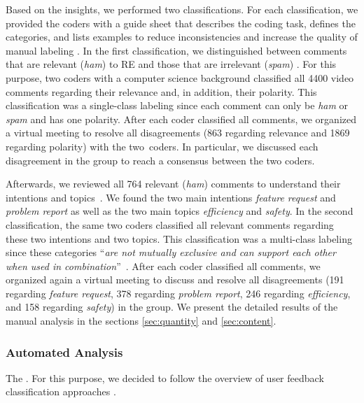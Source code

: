\documentclass[conference]{IEEEtran}
\begin{document}
{Based on the insights, we performed two classifications. For each classification, we provided the coders with a guide sheet that describes the coding task, defines the categories, and lists examples to reduce inconsistencies and increase the quality of manual labeling \cite{Maalej.2015}. In the first classification, we distinguished between comments that are relevant (\textit{ham}) to RE and those that are irrelevant (\textit{spam}) \cite{Santos.2019}. For this purpose, two coders with a computer science background classified all 4400 video comments regarding their relevance and, in addition, their polarity. This classification was a single-class labeling since each comment can only be \textit{ham} or \textit{spam} and has one polarity. After each coder classified all comments, we organized a virtual meeting to resolve all disagreements (863 regarding relevance and 1869 regarding polarity) with the two~coders. In particular, we discussed each disagreement in the group to reach a consensus between the two coders.

Afterwards, we reviewed all 764 relevant (\textit{ham}) comments to understand their intentions and topics~\cite{Santos.2019}. We found the two main intentions \textit{feature request} and \textit{problem report} as well as the two main topics \textit{efficiency} and \textit{safety}. In the second classification, the same two coders classified all relevant comments regarding these two intentions and two topics. This classification was a multi-class labeling since these categories \enquote{\textit{are not mutually exclusive and can support each other when used in combination}}~\cite[p.~8]{Santos.2019}. After each coder classified all comments, we organized again a virtual meeting to discuss and resolve all disagreements (191 regarding \textit{feature request}, 378 regarding \textit{problem report}, 246 regarding \textit{efficiency}, and 158 regarding \textit{safety}) in the group. We present the detailed results of the manual analysis in the sections \ref{sec:quantity} and \ref{sec:content}.

\subsubsection{Automated Analysis}
\label{sec:automated-analysis}
The . For this purpose, we decided to follow the overview of user feedback classification approaches \cite{Santos.2019a}.

}
\end{document}
